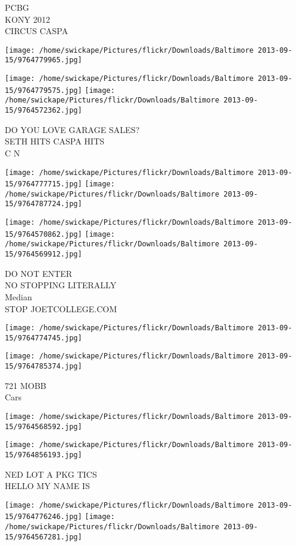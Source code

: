 \documentclass[10pt,letterpaper]{article}
\begin{document}
PCBG\\
KONY 2012\\
CIRCUS CASPA
\pagebreak

\texttt{[image: /home/swickape/Pictures/flickr/Downloads/Baltimore 2013-09-15/9764779965.jpg]}

\vspace{0.25in}
\texttt{[image: /home/swickape/Pictures/flickr/Downloads/Baltimore 2013-09-15/9764779575.jpg]}
\texttt{[image: /home/swickape/Pictures/flickr/Downloads/Baltimore 2013-09-15/9764572362.jpg]}

DO YOU LOVE GARAGE SALES?\\
SETH HITS CASPA HITS\\
C N
\pagebreak

\texttt{[image: /home/swickape/Pictures/flickr/Downloads/Baltimore 2013-09-15/9764777715.jpg]}
\texttt{[image: /home/swickape/Pictures/flickr/Downloads/Baltimore 2013-09-15/9764787724.jpg]}

\texttt{[image: /home/swickape/Pictures/flickr/Downloads/Baltimore 2013-09-15/9764570862.jpg]}
\texttt{[image: /home/swickape/Pictures/flickr/Downloads/Baltimore 2013-09-15/9764569912.jpg]}

DO NOT ENTER\\
NO STOPPING LITERALLY\\
Median\\
STOP JOETCOLLEGE.COM
\pagebreak

\texttt{[image: /home/swickape/Pictures/flickr/Downloads/Baltimore 2013-09-15/9764774745.jpg]}

\vspace{0.25in}
\texttt{[image: /home/swickape/Pictures/flickr/Downloads/Baltimore 2013-09-15/9764785374.jpg]}

721 MOBB\\
Cars
\pagebreak

\texttt{[image: /home/swickape/Pictures/flickr/Downloads/Baltimore 2013-09-15/9764568592.jpg]}

\vspace{0.25in}
\texttt{[image: /home/swickape/Pictures/flickr/Downloads/Baltimore 2013-09-15/9764856193.jpg]}

NED LOT A PKG TICS\\
HELLO MY NAME IS
\pagebreak

\texttt{[image: /home/swickape/Pictures/flickr/Downloads/Baltimore 2013-09-15/9764776246.jpg]}
\texttt{[image: /home/swickape/Pictures/flickr/Downloads/Baltimore 2013-09-15/9764567281.jpg]}
\end{document}
